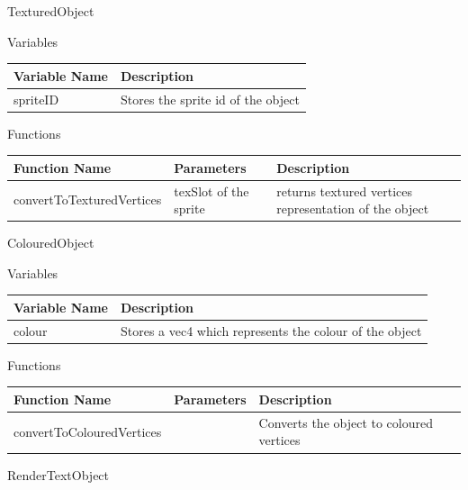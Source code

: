 \documentclass[../../Main.tex]{subfiles}
\begin{document}
    TexturedObject
    \begin{center}
        Variables
        \begin{tabular}{ | m{} | m{} | }
            \hline
            \textbf{Variable Name} & \textbf{Description} \\
            \hline
            spriteID & Stores the sprite id of the object \\
            \hline
        \end{tabular}
        Functions
        \begin{tabular}{ | m{} | m{}| m{} | }
            \hline
            \textbf{Function Name} & \textbf{Parameters} & \textbf{Description} \\
            \hline
            convertToTexturedVertices & texSlot of the sprite & returns textured vertices representation of the object \\
            \hline
        \end{tabular}
    \end{center}
    ColouredObject
    \begin{center}
        Variables
        \begin{tabular}{ | m{} | m{} | }
            \hline
            \textbf{Variable Name} & \textbf{Description} \\
            \hline
            colour & Stores a vec4 which represents the colour of the object \\
            \hline
        \end{tabular}
        Functions
        \begin{tabular}{ | m{} | m{}| m{} | }
            \hline
            \textbf{Function Name} & \textbf{Parameters} & \textbf{Description} \\
            \hline
            convertToColouredVertices & & Converts the object to coloured vertices \\
            \hline
        \end{tabular}
    \end{center}
    RenderTextObject
\end{document}
